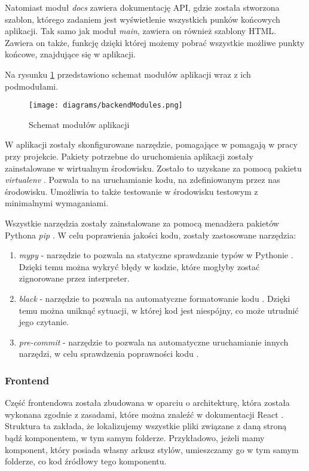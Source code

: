 Natomiast moduł \textit{docs} zawiera dokumentację API, gdzie została stworzona szablon, którego zadaniem jest wyświetlenie wszystkich punków końcowych aplikacji. Tak samo jak moduł \textit{main}, zawiera on również szablony HTML. Zawiera on także, funkcję dzięki której możemy pobrać wszystkie możliwe punkty końcowe, znajdujące się w aplikacji.

Na rysunku \ref{backend} przedstawiono schemat modułów aplikacji wraz z ich podmodułami.

\begin{figure}[H]
    \centering
    \texttt{[image: diagrams/backendModules.png]}
    \caption{Schemat modułów aplikacji}
    \label{backend}
\end{figure}

W aplikacji zostały skonfigurowane narzędzie, pomagające w pomagają w pracy przy projekcie. Pakiety potrzebne do uruchomienia aplikacji zostały zainstalowane w wirtualnym środowisku. Zostało to uzyskane za pomocą pakietu \textit{virtualenv} \cite{virtualenv}. Pozwala to na uruchamianie kodu, na zdefiniowanym przez nas środowisku. Umożliwia to także testowanie w środowisku testowym z minimalnymi wymaganiami. 

Wszystkie narzędzia zostały zainstalowane za pomocą menadżera pakietów Pythona \textit{pip} \cite{pip}. W celu poprawienia jakości kodu, zostały zastosowane narzędzia:
\begin{enumerate}
    \item \textit{mypy} - narzędzie to pozwala na statyczne sprawdzanie typów w Pythonie \cite{mypy}. Dzięki temu można wykryć błędy w kodzie, które mogłyby zostać zignorowane przez interpreter. 
    \item \textit{black} - narzędzie to pozwala na automatyczne formatowanie kodu \cite{black}. Dzięki temu można uniknąć sytuacji, w której kod jest niespójny, co może utrudnić jego czytanie.
    \item \textit{pre-commit} - narzędzie to pozwala na automatyczne uruchamianie innych narzędzi, w celu sprawdzenia poprawności kodu \cite{pre_commit}.
\end{enumerate}

\subsubsection{Frontend}
Część frontendowa została zbudowana w oparciu o architekturę, która została wykonana zgodnie z zasadami, które można znaleźć w dokumentacji \cite{React_file_structure} React \cite{React}. Struktura ta zakłada, że lokalizujemy wszystkie pliki związane z daną stroną bądź komponentem, w tym samym folderze. Przykładowo, jeżeli mamy komponent, który posiada własny arkusz stylów, umieszczamy go w tym samym folderze, co kod źródłowy tego komponentu.

